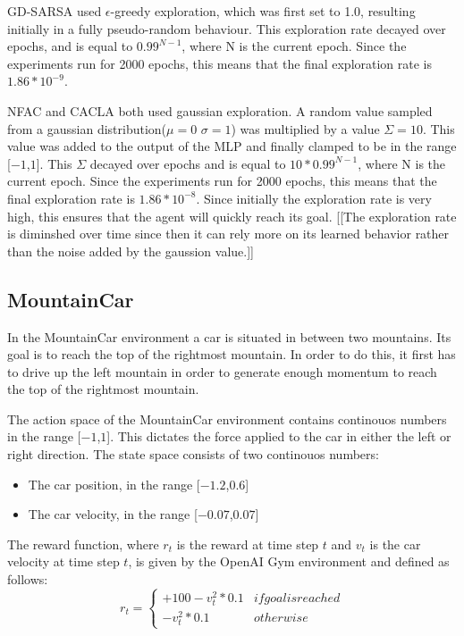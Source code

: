 GD-SARSA used $\epsilon$-greedy exploration, which was first set to 1.0, resulting initially in a fully pseudo-random behaviour. This exploration rate decayed over epochs, and is equal to $0.99^{N-1}$, where N is the current epoch. Since the experiments run for 2000 epochs, this means that the final exploration rate is $1.86*10^{-9}$.   

NFAC and CACLA both used gaussian exploration.  A random value sampled from a gaussian distribution($\mu=0$ $\sigma=1$) was multiplied by a value $\Sigma=10$. This value was added to the output of the MLP and finally clamped to be in the range [$-1$,$1$]. This $\Sigma$ decayed over epochs and is equal to  $10 * 0.99^{N-1}$, where N is the current epoch. Since the experiments run for 2000 epochs, this means that the final exploration rate is $1.86*10^{-8}$. Since initially the exploration rate is very high, this ensures that the agent will quickly reach its goal. [[The exploration rate is diminshed over time since then it can rely more on its learned behavior rather than the noise added by the gaussion value.]] 

\subsection{MountainCar}
In the MountainCar environment a car is situated in between two mountains. Its goal is to reach the top of the rightmost mountain. In order to do this, it first has to drive up the left mountain in order to generate enough momentum to reach the top of the rightmost mountain. 

The action space of the MountainCar environment contains continouos numbers in the range [$-1$,$1$]. This dictates the force applied to the car in either the left or right direction. The state space consists of two continouos numbers:
\begin{itemize}
    \item[] The car position, in the range [$-1.2$,$0.6$]
    \item[] The car velocity, in the range [$-0.07$,$0.07$]
\end{itemize}

The reward function, where $r_t$ is the reward at time step $t$ and $v_t$ is the car velocity at time step $t$, is given by the OpenAI Gym environment and defined as follows:
\begin{equation}
    r_t =
    \begin{cases*}
      +100 -v_t^2 * 0.1 & if goal is reached \\
      -v_t^2 * 0.1 & otherwise
    \end{cases*}
\end{equation}

